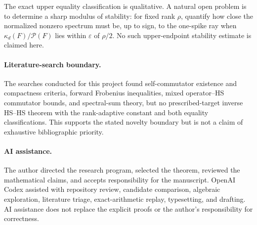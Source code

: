 \documentclass[11pt]{article}
\theoremstyle{definition}
\theoremstyle{remark}
\newcommand{\1}{\mathbf 1}
\newcommand{\PP}{\mathcal P}
\begin{document}
The exact upper equality classification is qualitative.  A natural open problem is to determine a sharp modulus of stability: for fixed rank $\rho$, quantify how close the normalized nonzero spectrum must be, up to sign, to the one-spike ray when $\kappa_d(F)/\PP(F)$ lies within $\varepsilon$ of $\rho/2$.  No such upper-endpoint stability estimate is claimed here.

\paragraph{Literature-search boundary.}
The searches conducted for this project found self-commutator existence and compactness criteria, forward Frobenius inequalities, mixed operator--HS commutator bounds, and spectral-sum theory, but no prescribed-target inverse HS--HS theorem with the rank-adaptive constant and both equality classifications.  This supports the stated novelty boundary but is not a claim of exhaustive bibliographic priority.

\paragraph{AI assistance.}
The author directed the research program, selected the theorem, reviewed the mathematical claims, and accepts responsibility for the manuscript.  OpenAI Codex assisted with repository review, candidate comparison, algebraic exploration, literature triage, exact-arithmetic replay, typesetting, and drafting.  AI assistance does not replace the explicit proofs or the author's responsibility for correctness.
\end{document}
